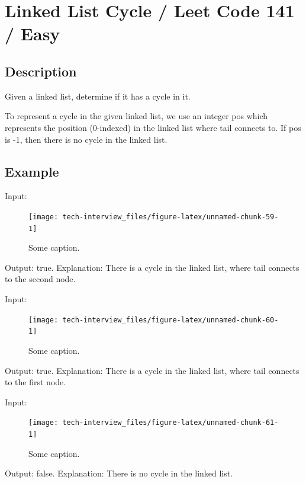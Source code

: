 \documentclass[]{book}
\begin{document}
\hypertarget{linked-list-cycle-leet-code-141-easy}{%
\section{Linked List Cycle / Leet Code 141 / Easy}\label{linked-list-cycle-leet-code-141-easy}}

\hypertarget{description-90}{%
\subsection{Description}\label{description-90}}

Given a linked list, determine if it has a cycle in it.

To represent a cycle in the given linked list, we use an integer pos which represents the position
(0-indexed) in the linked list where tail connects to. If pos is -1, then there is no cycle in the linked
list.

\hypertarget{example-86}{%
\subsection{Example}\label{example-86}}

Input:

\begin{figure}
\texttt{[image: tech-interview\_files/figure-latex/unnamed-chunk-59-1]} \caption{Some caption.}\label{fig:unnamed-chunk-59}
\end{figure}

Output: true. Explanation: There is a cycle in the linked list, where
tail connects to the second node.

Input:

\begin{figure}
\texttt{[image: tech-interview\_files/figure-latex/unnamed-chunk-60-1]} \caption{Some caption.}\label{fig:unnamed-chunk-60}
\end{figure}

Output: true. Explanation: There is a cycle in the linked list, where tail
connects to the first node.

Input:

\begin{figure}
\texttt{[image: tech-interview\_files/figure-latex/unnamed-chunk-61-1]} \caption{Some caption.}\label{fig:unnamed-chunk-61}
\end{figure}

Output: false. Explanation: There is no cycle in the linked list.
\end{document}
